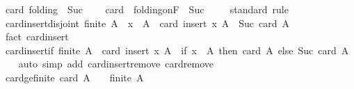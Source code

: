 \begin{isabellebody}
\begin{isamarkuptext}
\end{isamarkuptext}\isamarkuptrue%
\isamarkupfalse%
\ card{\isacharcolon}{\kern0pt}\ folding\ {\isachardoublequoteopen}{\isasymlambda}{\isacharunderscore}{\kern0pt}{\isachardot}{\kern0pt}\ Suc{\isachardoublequoteclose}\ {}\isanewline
\ \ \ card\ {\isacharequal}{\kern0pt}\ {\isachardoublequoteopen}folding{\isacharunderscore}{\kern0pt}on{\isachardot}{\kern0pt}F\ {\isacharparenleft}{\kern0pt}{\isasymlambda}{\isacharunderscore}{\kern0pt}{\isachardot}{\kern0pt}\ Suc{\isacharparenright}{\kern0pt}\ {}{\isachardoublequoteclose}\isanewline
%
\isadelimproof
\ \ %
\endisadelimproof
%
\isatagproof
{}\isamarkupfalse%
\ standard\ rule%
\endisatagproof
{\isafoldproof}%
%
\isadelimproof
\isanewline
%
\endisadelimproof
\isanewline
{}\isamarkupfalse%
\ card{\isacharunderscore}{\kern0pt}insert{\isacharunderscore}{\kern0pt}disjoint{\isacharcolon}{\kern0pt}\ {\isachardoublequoteopen}finite\ A\ {\isasymLongrightarrow}\ x\ {\isasymnotin}\ A\ {\isasymLongrightarrow}\ card\ {\isacharparenleft}{\kern0pt}insert\ x\ A{\isacharparenright}{\kern0pt}\ {\isacharequal}{\kern0pt}\ Suc\ {\isacharparenleft}{\kern0pt}card\ A{\isacharparenright}{\kern0pt}{\isachardoublequoteclose}\isanewline
%
\isadelimproof
\ \ %
\endisadelimproof
%
\isatagproof
{}\isamarkupfalse%
\ {\isacharparenleft}{\kern0pt}fact\ card{\isachardot}{\kern0pt}insert{\isacharparenright}{\kern0pt}%
\endisatagproof
{\isafoldproof}%
%
\isadelimproof
\isanewline
%
\endisadelimproof
\isanewline
{}\isamarkupfalse%
\ card{\isacharunderscore}{\kern0pt}insert{\isacharunderscore}{\kern0pt}if{\isacharcolon}{\kern0pt}\ {\isachardoublequoteopen}finite\ A\ {\isasymLongrightarrow}\ card\ {\isacharparenleft}{\kern0pt}insert\ x\ A{\isacharparenright}{\kern0pt}\ {\isacharequal}{\kern0pt}\ {\isacharparenleft}{\kern0pt}if\ x\ {\isasymin}\ A\ then\ card\ A\ else\ Suc\ {\isacharparenleft}{\kern0pt}card\ A{\isacharparenright}{\kern0pt}{\isacharparenright}{\kern0pt}{\isachardoublequoteclose}\isanewline
%
\isadelimproof
\ \ %
\endisadelimproof
%
\isatagproof
{}\isamarkupfalse%
\ auto\ {\isacharparenleft}{\kern0pt}simp\ add{\isacharcolon}{\kern0pt}\ card{\isachardot}{\kern0pt}insert{\isacharunderscore}{\kern0pt}remove\ card{\isachardot}{\kern0pt}remove{\isacharparenright}{\kern0pt}%
\endisatagproof
{\isafoldproof}%
%
\isadelimproof
\isanewline
%
\endisadelimproof
\isanewline
{}\isamarkupfalse%
\ card{\isacharunderscore}{\kern0pt}ge{\isacharunderscore}{\kern0pt}{}{\isacharunderscore}{\kern0pt}finite{\isacharcolon}{\kern0pt}\ {\isachardoublequoteopen}card\ A\ {\isachargreater}{\kern0pt}\ {}\ {\isasymLongrightarrow}\ finite\ A{\isachardoublequoteclose}\isanewline

\end{isabellebody}
